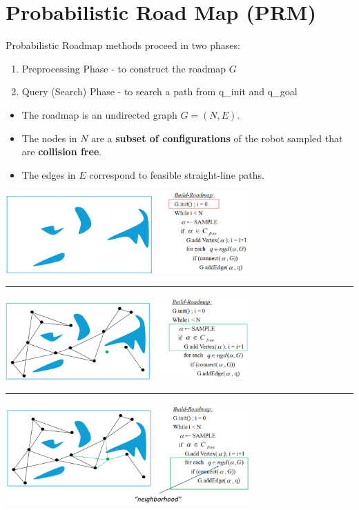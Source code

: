 \documentclass[10pt]{article}
\begin{document}
\section*{Probabilistic Road Map (PRM)}
Probabilistic Roadmap methods proceed in two phases:
\begin{enumerate}
    \item Preprocessing Phase - to construct the roadmap $G$
    \item Query (Search) Phase - to search a path from q\_init and q\_goal
\end{enumerate}
\begin{itemize}
	\item The roadmap is an undirected graph $G = (N, E)$.
	\item The nodes in $N$ are a \textbf{subset of configurations} of the robot sampled that are \textbf{collision free}.
	\item The edges in $E$ correspond to feasible straight-line paths.
\end{itemize}
\begin{center} 
	\includegraphics*[width=0.7\textwidth]{L1_2.png} \\
    \rule{\textwidth}{1pt}
    \includegraphics*[width=0.7\textwidth]{L1_3.png} \\
    \rule{\textwidth}{1pt}
    \includegraphics*[width=0.7\textwidth]{L1_4.png} \\
\end{center}
\end{document}
